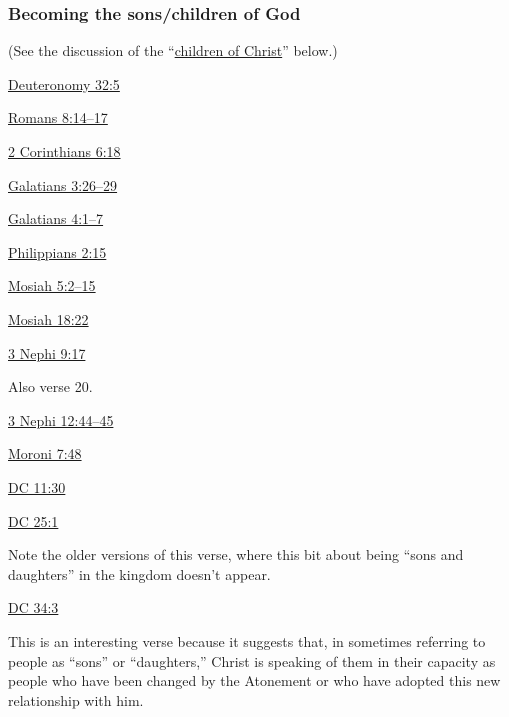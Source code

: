 	\subsubsection{Becoming the sons/children of God}
		\label{NEWBIRTH-sons}
		
		\begin{compactitem}
			\item (See the discussion of the ``\hyperref[NEWBIRTH-children-christ]{children of Christ}'' below.)
			\item \hyperref[DEUTERONOMY-32-5]{Deuteronomy 32:5}
			\item \hyperref[ROMANS-8-14]{Romans 8:14--17}
			\item \hyperref[2CORINTHIANS-6-18]{2 Corinthians 6:18}
			\item \hyperref[GALATIANS-3-26]{Galatians 3:26--29}
			\item \hyperref[GALATIANS-4-1]{Galatians 4:1--7}
			\item \hyperref[PHILIPPIANS-2-15]{Philippians 2:15}
			\item \hyperref[MOSIAH-5-2]{Mosiah 5:2--15}
			\item \hyperref[MOSIAH-18-22]{Mosiah 18:22}
			\item \hyperref[3NEPHI-9-17]{3 Nephi 9:17}
				\begin{compactitem}
					\item Also verse 20.
				\end{compactitem} 
			\item \hyperref[3NEPHI-12-44]{3 Nephi 12:44--45}
			\item \hyperref[MORONI-7-48]{Moroni 7:48}
			\item \hyperref[DC11-30]{DC 11:30}
			\item \hyperref[DC25-1]{DC 25:1} \phantom{.}
				\begin{compactitem}
					\item Note the older versions of this verse, where this bit about being ``sons and daughters'' in the kingdom doesn't appear.
				\end{compactitem}
			\item \hyperref[DC34-3]{DC 34:3} \phantom{.}
				\begin{compactitem}
					\item This is an interesting verse because it suggests that, in sometimes referring to people as ``sons'' or ``daughters,'' Christ is speaking of them in their capacity as people who have been changed by the Atonement or who have adopted this new relationship with him.

\end{compactitem}
\end{compactitem}
